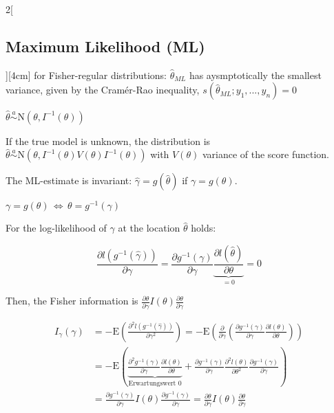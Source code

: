 \documentclass[8pt]{extarticle}
\begin{document}
\begin{multicols}{2}[\subsection{Maximum Likelihood (ML)}][4cm]
\noindent for Fisher-regular distributions: $\hat{\theta}_{ML}$ has aysmptotically the smallest variance, given by the Cramér-Rao inequality, 
   $s\left(\hat{\theta}_{ML};y_1,...,y_n\right) = 0$
   
$\hat{\theta} \overset{a}{\sim} \mathrm{N}\left(\theta, I^{-1}(\theta)\right)$

\noindent If the true model is unknown, the distribution is $\hat{\theta} \overset{a}{\sim} \mathrm{N}\left(\theta, I^{-1}(\theta)V(\theta)I^{-1}(\theta)\right)$ with $V(\theta)$ variance of the score function.
   
\noindent The ML-estimate is invariant: $\hat{\gamma} = g(\hat{\theta})$ if $\gamma = g(\theta)$. 
   
\begin{Proof}
$\gamma = g(\theta)\, \Leftrightarrow \,\theta = g^{-1}(\gamma)$

\noindent For the log-likelihood of $\gamma$ at the location $\hat{\theta}$ holds:

$$\frac{\partial l(g^{-1}(\hat{\gamma}))}{\partial \gamma} = \frac{\partial g^{-1}(\gamma)}{\partial\gamma} \underbrace{\frac{\partial l(\hat{\theta})}{\partial \theta}}_{=0} = 0$$
\end{Proof}   

\noindent Then, the Fisher information is $\frac{\partial\theta}{\partial\gamma} I(\theta) \frac{\partial\theta}{\partial\gamma}$

\begin{Proof}
\vspace{-1.5em}
\begin{align*}
I_{\gamma}(\gamma) &= 
-\mathrm{E}\left(\frac{\partial^2 l(g^{-1}(\hat{\gamma}))}{\partial \gamma^2} \right)= 
-\mathrm{E}\left(\frac{\partial}{\partial\gamma} \left( \frac{\partial g^{-1}(\gamma)}{\partial\gamma} \frac{\partial l(\theta)}{\partial\theta} \right)\right) \\
&= -\mathrm{E}\left(\underbrace{\frac{\partial^2 g^{-1}(\gamma)}{\partial\gamma}\frac{\partial l(\theta)}{\partial\theta}}_{\text{Erwartungswert 0}} + \frac{\partial g^{-1}(\gamma)}{\partial\gamma}\frac{\partial^2l(\theta)}{\partial\theta^2}\frac{\partial g^{-1}(\gamma)}{\partial\gamma}\right) \\
&= \frac{\partial g^{-1}(\gamma)}{\partial\gamma} I(\theta) \frac{\partial g^{-1}(\gamma)}{\partial\gamma} = \frac{\partial \theta}{\partial\gamma} I(\theta) \frac{\partial \theta}{\partial\gamma}
\end{align*}
\end{Proof}


\end{multicols}
\end{document}
